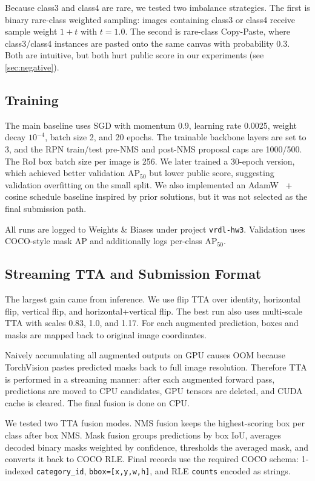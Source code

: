 \documentclass[10pt,twocolumn,letterpaper]{article}
\begin{document}
Because class3 and class4 are rare, we tested two imbalance strategies. The first is binary rare-class weighted sampling: images containing class3 or class4 receive sample weight $1+t$ with $t=1.0$. The second is rare-class Copy-Paste, where class3/class4 instances are pasted onto the same canvas with probability 0.3. Both are intuitive, but both hurt public score in our experiments (see \cref{sec:negative}).

\subsection{Training}
The main baseline uses SGD with momentum 0.9, learning rate 0.0025, weight decay $10^{-4}$, batch size 2, and 20 epochs. The trainable backbone layers are set to 3, and the RPN train/test pre-NMS and post-NMS proposal caps are 1000/500. The RoI box batch size per image is 256. We later trained a 30-epoch version, which achieved better validation AP$_{50}$ but lower public score, suggesting validation overfitting on the small split. We also implemented an AdamW~\cite{loshchilov2019adamw} + cosine schedule baseline inspired by prior solutions, but it was not selected as the final submission path.

All runs are logged to Weights \& Biases under project \texttt{vrdl-hw3}. Validation uses COCO-style mask AP and additionally logs per-class AP$_{50}$.

\subsection{Streaming TTA and Submission Format}
The largest gain came from inference. We use flip TTA over identity, horizontal flip, vertical flip, and horizontal+vertical flip. The best run also uses multi-scale TTA with scales 0.83, 1.0, and 1.17. For each augmented prediction, boxes and masks are mapped back to original image coordinates.

Naively accumulating all augmented outputs on GPU causes OOM because TorchVision pastes predicted masks back to full image resolution. Therefore TTA is performed in a streaming manner: after each augmented forward pass, predictions are moved to CPU candidates, GPU tensors are deleted, and CUDA cache is cleared. The final fusion is done on CPU.

We tested two TTA fusion modes. NMS fusion keeps the highest-scoring box per class after box NMS. Mask fusion groups predictions by box IoU, averages decoded binary masks weighted by confidence, thresholds the averaged mask, and converts it back to COCO RLE. Final records use the required COCO schema: 1-indexed \texttt{category\_id}, \texttt{bbox=[x,y,w,h]}, and RLE \texttt{counts} encoded as strings.
\end{document}
